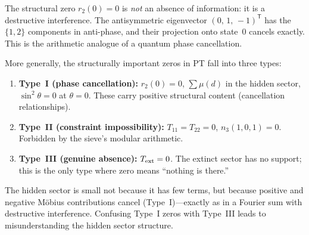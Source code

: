 \documentclass[12pt,a4paper]{article}
\begin{document}
\begin{remark}\mBR
\label{rem:zero_phase}
The structural zero $r_2(0) = 0$ is \emph{not} an absence of
information: it is a destructive interference.  The antisymmetric
eigenvector $(0,\,1,\,-1)^{\!\mathsf{T}}$ has the $\{1,2\}$ components
in anti-phase, and their projection onto state~$0$ cancels exactly.
This is the arithmetic analogue of a quantum phase cancellation.

More generally, the structurally important zeros in PT fall into three
types:
\begin{enumerate}[nosep]
\item \textbf{Type~I (phase cancellation):} $r_2(0) = 0$,
  $\sum\mu(d)$ in the hidden sector, $\sin^2\!\theta = 0$ at $\theta = 0$.
  These carry positive structural content (cancellation relationships).
\item \textbf{Type~II (constraint impossibility):}
  $T_{11} = T_{22} = 0$, $n_3(1,0,1) = 0$.
  Forbidden by the sieve's modular arithmetic.
\item \textbf{Type~III (genuine absence):} $T_{\rm ext} = 0$.
  The extinct sector has no support; this is the only type where
  zero means ``nothing is there.''
\end{enumerate}
The hidden sector is small not because it has few terms,
but because positive and negative M\"obius contributions cancel
(Type~I)---exactly as in a Fourier sum with destructive interference.
Confusing Type~I zeros with Type~III leads to misunderstanding the
hidden sector structure.
\end{remark}
\end{document}
